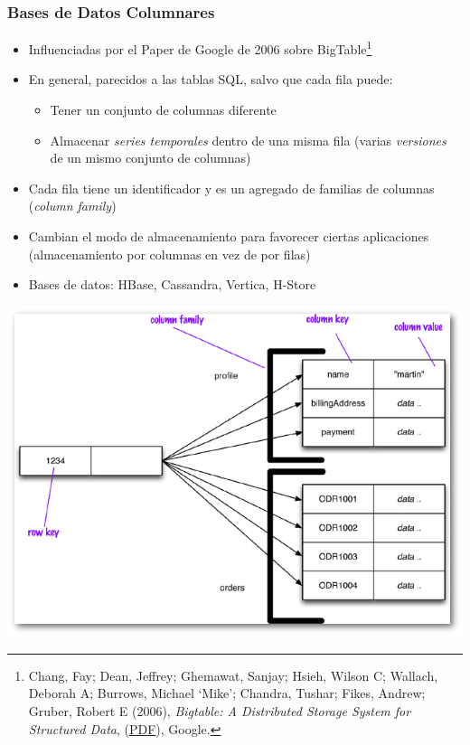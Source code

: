 \documentclass[14pt]{beamer}
\begin{document}
\begin{frame}[allowframebreaks]
  \frametitle{Bases de Datos Columnares}
\begin{itemize}
\item Influenciadas por el Paper de Google de 2006 sobre BigTable\footnote{Chang, Fay; Dean, Jeffrey; Ghemawat, Sanjay; Hsieh,
    Wilson C; Wallach, Deborah A; Burrows, Michael ‘Mike’; Chandra,
    Tushar; Fikes, Andrew; Gruber, Robert E (2006), {\em Bigtable: A
      Distributed Storage System for Structured Data},
    (\href{http://research.google.com/archive/bigtable-osdi06.pdf}{PDF}),
    Google.}
\item En general, parecidos a las tablas SQL, salvo que cada fila puede:
  \begin{itemize}
  \item Tener un conjunto de columnas diferente
\item Almacenar {\em series temporales} dentro de una misma fila (varias
  {\em versiones} de un mismo conjunto de columnas)
  \end{itemize}
\item Cada fila tiene un identificador y es un agregado de familias de
  columnas ({\em column family})

\item Cambian el modo de almacenamiento para favorecer ciertas aplicaciones
  (almacenamiento por columnas en vez de por filas)
\item Bases de datos: HBase, Cassandra, Vertica, H-Store
\end{itemize}
\end{frame}

\begin{frame}[plain]
\includegraphics[width=\textwidth]{img/column}
\end{frame}
\end{document}
